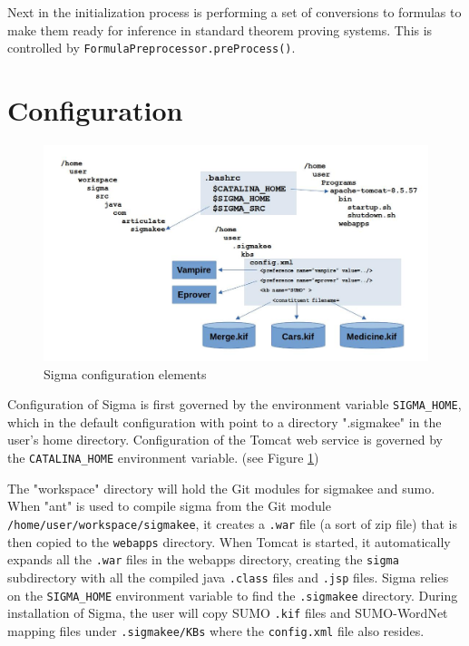 \documentclass{book}
\begin{document}
Next in the initialization process is performing a set of conversions to formulas to
make them ready for inference in standard theorem proving systems.  This is controlled
by \texttt{FormulaPreprocessor.preProcess()}.


\section{Configuration}
\label{chap:KnowRepr:sec:Conf}

\begin{figure}
  \centering
  \includegraphics[width=4.5in]{pictures/config.jpg}
  \caption{Sigma configuration elements}
  \label{fig:config}
\end{figure}

Configuration of Sigma is first governed by the environment variable \texttt{SIGMA\_HOME},
which in the default configuration with point to a directory ".sigmakee" in the
user's home directory. Configuration of the Tomcat web service is governed by
the \texttt{CATALINA\_HOME} environment variable. (see Figure \ref{fig:config})

\begin{sloppypar}
The "workspace" directory will hold the Git modules for sigmakee and sumo. When
"ant" is used to compile sigma from the Git module
\texttt{/home/user/workspace/sigmakee}, it creates a \texttt{.war} file (a sort
of zip file) that is then copied to the \texttt{webapps} directory. When Tomcat
is started, it automatically expands all the \texttt{.war} files in the webapps
directory, creating the \texttt{sigma} subdirectory with all the compiled java
\texttt{.class} files and \texttt{.jsp} files.  Sigma relies on the
\texttt{SIGMA\_HOME} environment variable to find the \texttt{.sigmakee}
directory. During installation of Sigma, the user will copy SUMO \texttt{.kif}
files and SUMO-WordNet mapping files under \texttt{.sigmakee/KBs} where the
\texttt{config.xml} file also resides.
\end{sloppypar}
\end{document}
